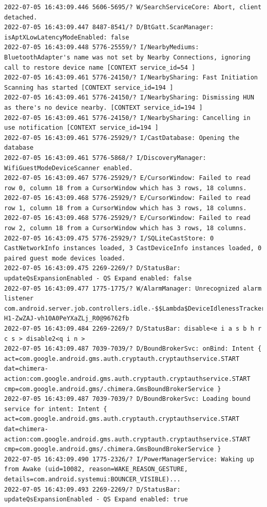 \documentclass[a4paper,12pt]{book}
\begin{document}
\begin{lstlisting}
2022-07-05 16:43:09.446 5606-5695/? W/SearchServiceCore: Abort, client detached.
2022-07-05 16:43:09.447 8487-8541/? D/BtGatt.ScanManager: isAptXLowLatencyModeEnabled: false
2022-07-05 16:43:09.448 5776-25559/? I/NearbyMediums: BluetoothAdapter's name was not set by Nearby Connections, ignoring call to restore device name [CONTEXT service_id=54 ]
2022-07-05 16:43:09.461 5776-24150/? I/NearbySharing: Fast Initiation Scanning has started [CONTEXT service_id=194 ]
2022-07-05 16:43:09.461 5776-24150/? I/NearbySharing: Dismissing HUN as there's no device nearby. [CONTEXT service_id=194 ]
2022-07-05 16:43:09.461 5776-24150/? I/NearbySharing: Cancelling in use notification [CONTEXT service_id=194 ]
2022-07-05 16:43:09.461 5776-25929/? I/CastDatabase: Opening the database
2022-07-05 16:43:09.461 5776-5868/? I/DiscoveryManager: WifiGuestModeDeviceScanner enabled.
2022-07-05 16:43:09.467 5776-25929/? E/CursorWindow: Failed to read row 0, column 18 from a CursorWindow which has 3 rows, 18 columns.
2022-07-05 16:43:09.468 5776-25929/? E/CursorWindow: Failed to read row 1, column 18 from a CursorWindow which has 3 rows, 18 columns.
2022-07-05 16:43:09.468 5776-25929/? E/CursorWindow: Failed to read row 2, column 18 from a CursorWindow which has 3 rows, 18 columns.
2022-07-05 16:43:09.475 5776-25929/? I/SQLiteCastStore: 0 CastNetworkInfo instances loaded, 3 CastDeviceInfo instances loaded, 0 paired guest mode devices loaded.
2022-07-05 16:43:09.475 2269-2269/? D/StatusBar: updateQsExpansionEnabled - QS Expand enabled: false
2022-07-05 16:43:09.477 1775-1775/? W/AlarmManager: Unrecognized alarm listener com.android.server.job.controllers.idle.-$$Lambda$DeviceIdlenessTracker$-H1-ZwZAJ-vh10A0PeYXaZLj_R0@96762fb
2022-07-05 16:43:09.484 2269-2269/? D/StatusBar: disable<e i a s b h r c s > disable2<q i n >
2022-07-05 16:43:09.487 7039-7039/? D/BoundBrokerSvc: onBind: Intent { act=com.google.android.gms.auth.cryptauth.cryptauthservice.START dat=chimera-action:com.google.android.gms.auth.cryptauth.cryptauthservice.START cmp=com.google.android.gms/.chimera.GmsBoundBrokerService }
2022-07-05 16:43:09.487 7039-7039/? D/BoundBrokerSvc: Loading bound service for intent: Intent { act=com.google.android.gms.auth.cryptauth.cryptauthservice.START dat=chimera-action:com.google.android.gms.auth.cryptauth.cryptauthservice.START cmp=com.google.android.gms/.chimera.GmsBoundBrokerService }
2022-07-05 16:43:09.490 1775-2326/? I/PowerManagerService: Waking up from Awake (uid=10082, reason=WAKE_REASON_GESTURE, details=com.android.systemui:BOUNCER_VISIBLE)...
2022-07-05 16:43:09.493 2269-2269/? D/StatusBar: updateQsExpansionEnabled - QS Expand enabled: true

\end{lstlisting}
\end{document}
